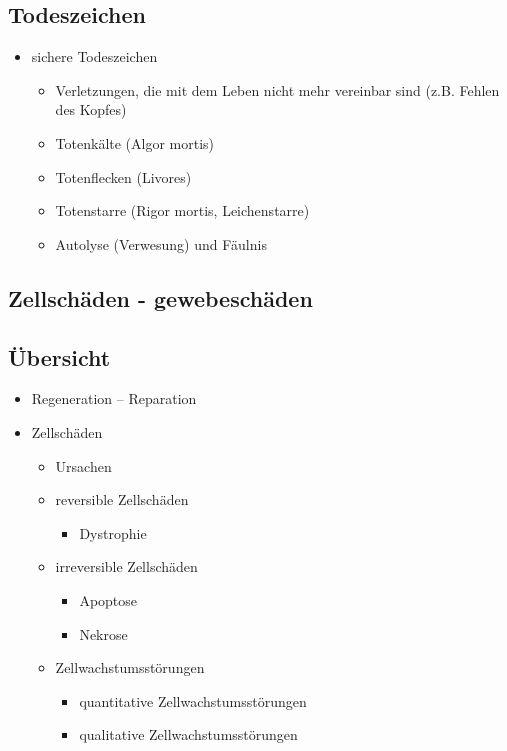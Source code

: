 \subsection{Todeszeichen}
	\begin{itemize}
		\item sichere Todeszeichen
			\begin{itemize}
				\item Verletzungen, die mit dem Leben nicht mehr vereinbar sind (z.B. Fehlen des Kopfes)
				\item Totenkälte (Algor mortis)
				\item Totenflecken (Livores)
				\item Totenstarre (Rigor mortis, Leichenstarre)
				\item Autolyse (Verwesung) und Fäulnis
			\end{itemize}
	\end{itemize}

\subsection{Zellschäden - gewebeschäden}

\subsection{Übersicht}
	\begin{itemize}
		\item Regeneration – Reparation
		\item Zellschäden
			\begin{itemize}
				\item Ursachen
				\item reversible Zellschäden
					\begin{itemize}
						\item Dystrophie
					\end{itemize}
				\item irreversible Zellschäden
					\begin{itemize}
						\item Apoptose
						\item Nekrose
					\end{itemize}
				\item Zellwachstumsstörungen
					\begin{itemize}
						\item quantitative Zellwachstumsstörungen
						\item qualitative Zellwachstumsstörungen
					\end{itemize}
			\end{itemize}
	\end{itemize}

